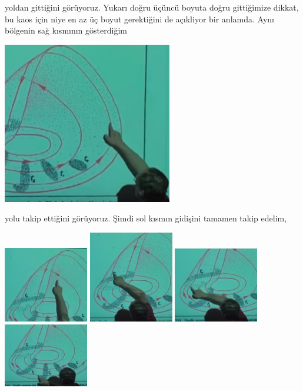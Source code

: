\documentclass[12pt,fleqn]{article}\usepackage{../../common}
\begin{document}
yoldan gittiğini görüyoruz. Yukarı doğru üçüncü boyuta doğru gittiğimize dikkat,
bu kaos için niye en az üç boyut gerektiğini de açıkliyor bir anlamda. Aynı
bölgenin sağ kısmının gösterdiğim

\includegraphics[width=20em]{23_09.png}

yolu takip ettiğini görüyoruz. Şimdi sol kısmın gidişini tamamen takip edelim,

\includegraphics[width=10em]{23_10.png}
\includegraphics[width=10em]{23_11.png}
\includegraphics[width=10em]{23_12.png}
\includegraphics[width=10em]{23_13.png}
\end{document}
